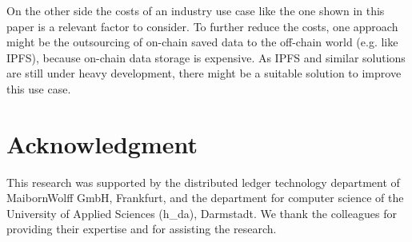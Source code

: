\documentclass[conference]{IEEEtran}
\begin{document}
On the other side the costs of an industry use case like the one shown in this paper is a relevant factor to consider. To further reduce the costs, one approach might be the outsourcing of on-chain saved data to the off-chain world (e.g. like IPFS), because on-chain data storage is expensive. As IPFS and similar solutions are still under heavy development, there might be a suitable solution to improve this use case.


\section*{Acknowledgment}
This research was supported by the distributed ledger technology department of MaibornWolff GmbH, Frankfurt, and the department for computer science of the University of Applied Sciences (h\_da), Darmstadt. We thank the colleagues for providing their expertise and for assisting the research.
\end{document}
